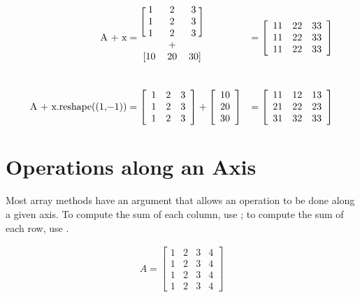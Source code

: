 \begin{align*}
\text{\li{A + x}}
&= \begin{blockarray}{ccc}
\begin{block}{[ccc]}
1 & 2 & 3\\
1 & 2 & 3\\
1 & 2 & 3\\
\end{block}
  & + &  \\
\begin{block}{[ccc]}
10 & 20 & 30\\
\end{block}
\end{blockarray}
&= \left[\begin{array}{ccc}
11 & 22 & 33\\
11 & 22 & 33\\
11 & 22 & 33
\end{array}\right]
\\ \\
\text{\li{A + x.reshape((1,-1))}}
&= \left[\begin{array}{ccc}
1 & 2 & 3 \\
1 & 2 & 3 \\
1 & 2 & 3 \\
\end{array}\right]
+ \left[\begin{array}{c}
10 \\ 20 \\ 30\\
\end{array}\right]
&= \left[\begin{array}{ccc}
11 & 12 & 13\\
21 & 22 & 23\\
31 & 32 & 33\\
\end{array}\right]
\end{align*}

\section*{Operations along an Axis} %

Most array methods have an  argument that allows an operation to be done along a given axis.
To compute the sum of each column, use ; to compute the sum of each row, use .

\begin{align*}
A = \left[\begin{array}{cccc}
1 & 2 & 3 & 4\\
1 & 2 & 3 & 4\\
1 & 2 & 3 & 4\\
1 & 2 & 3 & 4
\end{array}\right]
\end{align*}

